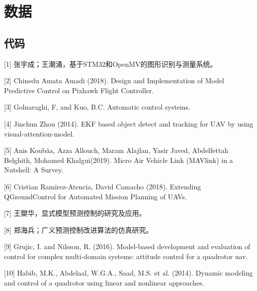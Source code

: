 \chapter{数据}

\section{代码}





\begin{thebibliography}{A1}
[1] 张宇成；王潮涌，基于STM32和OpenMV的图形识别与测量系统。

[2] Chinedu Amata Amadi (2018). Design and Implementation of Model Predictive Control on Pixhawk Flight Controller.

[3] Golnaraghi, F, and Kuo, B.C. Automatic control systems.

[4] Jinchun Zhou (2014). EKF based object detect and tracking for UAV by using visual-attention-model.

[5] Anis Koubâa, Azza Allouch, Maram Alajlan, Yasir Javed, Abdelfettah Belghith, Mohamed Khalgui(2019). Micro Air Vehicle Link (MAVlink) in a Nutshell: A Survey.

[6] Cristian Ramirez-Atencia, David Camacho (2018). Extending QGroundControl for Automated Mission Planning of UAVs.

[7] 王槊华，显式模型预测控制的研究及应用。

[8] 郑海兵；广义预测控制改进算法的仿真研究。

[9] Grujic, I. and Nilsson, R. (2016). Model-based development and evaluation of control
for complex multi-domain systems: attitude control for a quadrotor uav.

[10] Habib, M.K., Abdelaal, W.G.A., Saad, M.S. et al. (2014). Dynamic modeling and
control of a quadrotor using linear and nonlinear approaches.

\end{thebibliography}